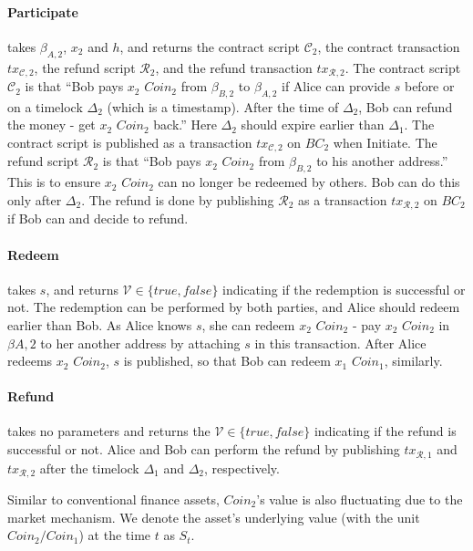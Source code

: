 \paragraph{Participate}
takes $\beta_{A, 2}$, $x_2$ and $h$,
and returns the contract script $\mathcal{C}_2$, the contract transaction $tx_{\mathcal{C}, 2}$, the refund script $\mathcal{R}_2$, and the refund transaction $tx_{\mathcal{R}, 2}$.
The contract script $\mathcal{C}_2$ is that ``Bob pays $x_2$ $Coin_2$ from $\beta_{B, 2}$ to $\beta_{A, 2}$ if Alice can provide $s$ before or on a timelock $\Delta_2$ (which is a timestamp). After the time of $\Delta_2$, Bob can refund the money - get $x_2$ $Coin_2$ back.''
Here $\Delta_2$ should expire earlier than $\Delta_1$.
The contract script is published as a transaction $tx_{\mathcal{C}, 2}$ on $BC_2$ when Initiate.
The refund script $\mathcal{R}_2$ is that ``Bob pays $x_2$ $Coin_2$ from $\beta_{B, 2}$ to his another address.'' This is to ensure $x_2$ $Coin_2$ can no longer be redeemed by others. Bob can do this only after $\Delta_2$.
The refund is done by publishing $\mathcal{R}_2$ as a transaction $tx_{\mathcal{R}, 2}$ on $BC_2$ if Bob can and decide to refund.

\paragraph{Redeem}
takes $s$,
and returns $\mathcal{V} \in \{true, false\}$ indicating if the redemption is successful or not.
The redemption can be performed by both parties, and Alice should redeem earlier than Bob.
As Alice knows $s$, she can redeem $x_2$ $Coin_2$ - pay $x_2$ $Coin_2$ in $\beta{A, 2}$ to her another address by attaching $s$ in this transaction.
After Alice redeems $x_2$ $Coin_2$, $s$ is published, so that Bob can redeem $x_1$ $Coin_1$, similarly.

\paragraph{Refund}
takes no parameters and returns the $\mathcal{V} \in \{true, false\}$ indicating if the refund is successful or not.
Alice and Bob can perform the refund by publishing $tx_{\mathcal{R}, 1}$ and $tx_{\mathcal{R}, 2}$ after the timelock $\Delta_1$ and $\Delta
_2$, respectively.

Similar to conventional finance assets, $Coin_2$'s value is also fluctuating due to the market mechanism.
We denote the asset's underlying value (with the unit $Coin_2 / Coin_1$) at the time $t$ as $S_t$.














